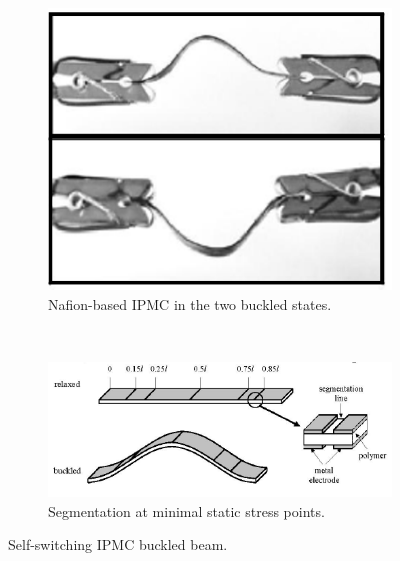 \begin{figure}[H]
    \centering
    \begin{subfigure}[t]{0.27\textwidth}
			\includegraphics[width=\textwidth]{Figures/IPMC_buckle.eps}
			\caption{Nafion-based IPMC in the two buckled states.}
			\label{fig:IPMC_buckle}
    \end{subfigure}
		~
    \begin{subfigure}[t]{0.6\textwidth}
			\includegraphics[width=\textwidth]{Figures/IPMC_segment.png}
			\caption{Segmentation at minimal static stress points.}
			\label{fig:IPMC_segment}
    \end{subfigure}
		\caption{Self-switching IPMC buckled beam\cite{rossiter_self-switching_2006}.}
		\label{fig:IPMC_work}
\end{figure}

